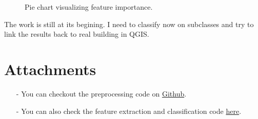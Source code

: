 \documentclass[a4paper, 11pt]{article}
\begin{document}
	\begin{figure}[H]
		{
			\caption{\label{fig::feat_import} Pie chart visualizing feature importance.}
		}
	\end{figure}

	The work is still at its begining. I need to classify now on subclasses and try to link the results back to real building in QGIS.

	\section*{Attachments}
	\begin{itemize}
		\item[-] You can checkout the preprocessing code on
		\href{https://github.com/ethiy/proj.city}{Github}.
		\item[-] You can also check the feature extraction and classification code
		\href{https://github.com/ethiy/qualcity}{here}.
	\end{itemize}

	
	
\end{document}
